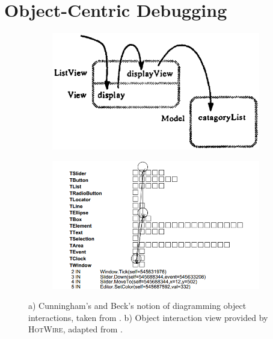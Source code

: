 
\section{Object-Centric Debugging}

\begin{figure}[b]
	\centering
	
	\begin{subfigure}[b]{0.45\textwidth}
		\centering
        \includegraphics[width=\textwidth]{../images/06-Cunningham-Diagram}
        \caption[Object Interaction Diagrams by Cunningham and Beck]{}
		\label{fig:DebugCunningham}
	\end{subfigure}
	\quad
	\begin{subfigure}[b]{0.45\textwidth}
		\centering
		\includegraphics[width=\textwidth]{../images/06-Laffra-HotWire}
		\caption[Object Interaction View provided by \textsc{HotWire}]{}
		\label{fig:DebugLaffra}
	\end{subfigure}
	
	\caption[TOC Caption]{
		a) Cunningham's and Beck's notion of diagramming object interactions, taken from \cite{cunningham_diagram_1986}.
		b) Object interaction view provided by \textsc{HotWire}, adapted from \cite{laffra_hotwire:_1994}.
	}
\end{figure}

